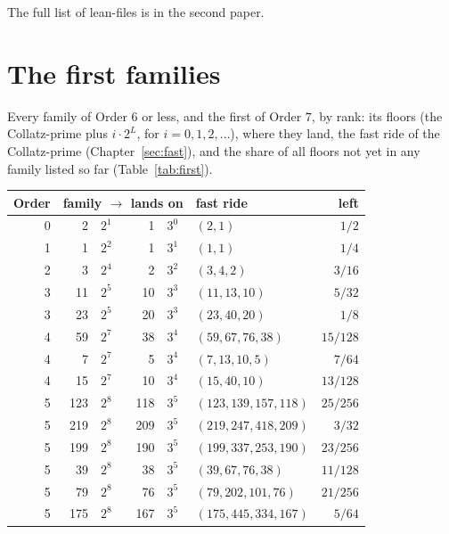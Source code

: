 \documentclass[10pt,a4paper,titlepage]{article}
\begin{document}
\noindent The full list of lean-files is in the second paper.

\section{The first families}
\label{app:table}

Every family of Order $6$ or less, and the first of Order $7$, by rank: its
floors (the Collatz-prime plus $i\cdot 2^L$, for $i = 0, 1, 2, \dots$), where they land, the fast ride
of the Collatz-prime (Chapter~\ref{sec:fast}), and the share of all floors
not yet in any family listed so far (Table~\ref{tab:first}).

\begin{table}[htbp]
\centering
\small
\begin{tabular}{@{}r r@{\,+\,$i\cdot$}l @{\,$\to$\,} r@{\,+\,$i\cdot$}l l r@{}}
\toprule
Order & \multicolumn{4}{c}{family $\to$ lands on} & fast ride & left \\
\midrule
0 &   2 & $2^1$    &   1 & $3^0$  & $(2, 1)$                    & $1/2$ \\
1 &   1 & $2^2$    &   1 & $3^1$  & $(1, 1)$                    & $1/4$ \\
2 &   3 & $2^4$    &   2 & $3^2$  & $(3, 4, 2)$                 & $3/16$ \\
3 &  11 & $2^5$    &  10 & $3^3$  & $(11, 13, 10)$              & $5/32$ \\
3 &  23 & $2^5$    &  20 & $3^3$  & $(23, 40, 20)$              & $1/8$ \\
4 &  59 & $2^7$    &  38 & $3^4$  & $(59, 67, 76, 38)$          & $15/128$ \\
4 &   7 & $2^7$    &   5 & $3^4$  & $(7, 13, 10, 5)$            & $7/64$ \\
4 &  15 & $2^7$    &  10 & $3^4$  & $(15, 40, 10)$              & $13/128$ \\
5 & 123 & $2^8$    & 118 & $3^5$  & $(123, 139, 157, 118)$      & $25/256$ \\
5 & 219 & $2^8$    & 209 & $3^5$  & $(219, 247, 418, 209)$      & $3/32$ \\
5 & 199 & $2^8$    & 190 & $3^5$  & $(199, 337, 253, 190)$      & $23/256$ \\
5 &  39 & $2^8$    &  38 & $3^5$  & $(39, 67, 76, 38)$          & $11/128$ \\
5 &  79 & $2^8$    &  76 & $3^5$  & $(79, 202, 101, 76)$        & $21/256$ \\
5 & 175 & $2^8$    & 167 & $3^5$  & $(175, 445, 334, 167)$      & $5/64$ \\

\end{tabular}
\end{table}
\end{document}
